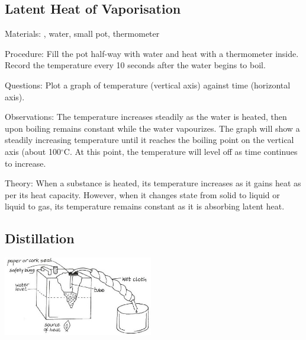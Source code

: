 \begin{multicols}{2}
\subsection{Latent Heat of Vaporisation}


\begin{description*}
\item[Materials:]{, water, small pot, thermometer}
\item[Procedure:]{Fill the pot half-way with water and heat with a thermometer inside. Record the temperature every 10 seconds after the water begins to boil.}
\item[Questions:]{Plot a graph of temperature (vertical axis) against time (horizontal axis).}
\item[Observations:]{The temperature increases steadily as the water is heated, then upon boiling remains constant while the water vapourizes. The graph will show a steadily increasing temperature until it reaches the boiling point on the vertical axis (about 100$^\circ$C. At this point, the temperature will level off as time continues to increase.}
\item[Theory:]{When a substance is heated, its temperature increases as it gains heat as per its heat capacity. However, when it changes state from solid to liquid or liquid to gas, its temperature remains constant as it is absorbing latent heat.}
\end{description*}

\subsection{Distillation} 

\begin{center}
\includegraphics[width=0.49\textwidth]{./img/vso/distillation.jpg}
\end{center}


\end{multicols}
